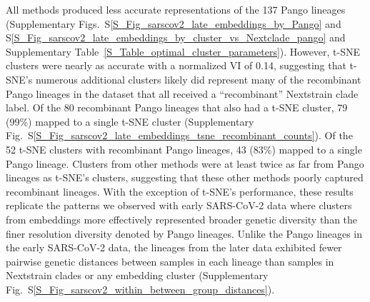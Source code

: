 \documentclass[webpdf,contemporary,large,single]{oup-authoring-template}%
\theoremstyle{thmstyleone}%
\theoremstyle{thmstyletwo}%
\theoremstyle{thmstylethree}%
\begin{document}
All methods produced less accurate representations of the 137 Pango lineages (Supplementary Figs.~S\ref{S_Fig_sarscov2_late_embeddings_by_Pango} and S\ref{S_Fig_sarscov2_late_embeddings_by_cluster_vs_Nextclade_pango} and Supplementary Table~\ref{S_Table_optimal_cluster_parameters}).
However, t-SNE clusters were nearly as accurate with a normalized VI of 0.14, suggesting that t-SNE's numerous additional clusters likely did represent many of the recombinant Pango lineages in the dataset that all received a ``recombinant'' Nextstrain clade label.
Of the 80 recombinant Pango lineages that also had a t-SNE cluster, 79 (99\%) mapped to a single t-SNE cluster (Supplementary Fig.~S\ref{S_Fig_sarscov2_late_embeddings_tsne_recombinant_counts}).
Of the 52 t-SNE clusters with recombinant Pango lineages, 43 (83\%) mapped to a single Pango lineage.
Clusters from other methods were at least twice as far from Pango lineages as t-SNE's clusters, suggesting that these other methods poorly captured recombinant lineages.
With the exception of t-SNE's performance, these results replicate the patterns we observed with early SARS-CoV-2 data where clusters from embeddings more effectively represented broader genetic diversity than the finer resolution diversity denoted by Pango lineages.
Unlike the Pango lineages in the early SARS-CoV-2 data, the lineages from the later data exhibited fewer pairwise genetic distances between samples in each lineage than samples in Nextstrain clades or any embedding cluster (Supplementary Fig.~S\ref{S_Fig_sarscov2_within_between_group_distances}).
\end{document}
